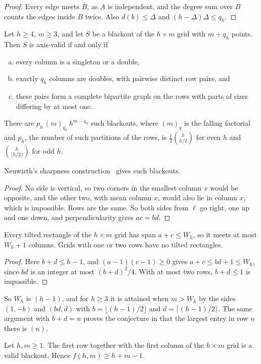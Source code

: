 \begin{proof}
Every edge meets $B$, as $A$ is independent, and the degree sum over $B$ counts the edges inside $B$ twice. Also $d(b)\le\Delta$ and $(h-\Delta)\Delta\le q_h$.
\end{proof}
\begin{theorem}\label{thm:equality}
Let $h\ge4$, $m\ge3$, and let $S$ be a blackout of the $h\times m$ grid with $m+q_h$ points. Then $S$ is axis-valid if and only if
\begin{enumerate}[(a)]
\item every column is a singleton or a double,
\item exactly $q_h$ columns are doubles, with pairwise distinct row pairs, and
\item these pairs form a complete bipartite graph on the rows with parts of sizes differing by at most one.
\end{enumerate}
There are $p_h\,(m)_{q_h}\,h^{m-q_h}$ such blackouts, where $(m)_q$ is the falling factorial and $p_h$, the number of such partitions of the rows, is $\frac12\binom h{h/2}$ for even $h$ and $\binom h{\lfloor h/2\rfloor}$ for odd $h$.
\end{theorem}

Neuwirth's sharpness construction~\cite[Proposition~17]{neuwirth2001} gives such blackouts.
\begin{proof}
No side is vertical, so two corners in the smallest column $x$ would be opposite, and the other two, with mean column $x$, would also lie in column $x$, which is impossible. Rows are the same. So both sides from $\ell$ go right, one up and one down, and perpendicularity gives $ac=bd$.
\end{proof}

\begin{lemma}\label{lem:span}
Every tilted rectangle of the $h\times m$ grid has span $a+c\le W_h$, so it meets at most $W_h+1$ columns. Grids with one or two rows have no tilted rectangles.
\end{lemma}

\begin{proof}
Here $b+d\le h-1$, and $(a-1)(c-1)\ge0$ gives $a+c\le bd+1\le W_h$, since $bd$ is an integer at most $(b+d)^2/4$. With at most two rows, $b+d\le1$ is impossible.
\end{proof}

So $W_h$ is $(h-1)$, and for $h\ge3$ it is attained when $m>W_h$ by the sides $(1,-b)$ and $(bd,d)$ with $b=\lfloor(h-1)/2\rfloor$ and $d=\lceil(h-1)/2\rceil$. The same argument with $b+d=n$ proves the conjecture in  that the largest entry in row $n$ there is $(n)$.
\begin{lemma}\label{lem:cross}
Let $h,m\ge1$. The first row together with the first column of the $h\times m$ grid is a valid blackout. Hence $f(h,m)\ge h+m-1$.
\end{lemma}

